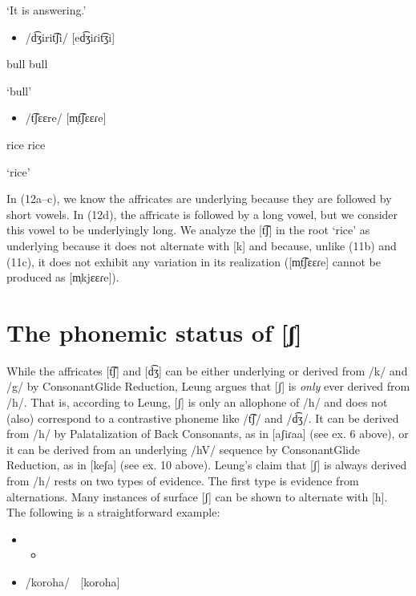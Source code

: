 \documentclass[output=paper]{langsci/langscibook}
\begin{document}
\textsc{    ‘}It is answering.’

\begin{itemize}
\item /d͡ʒirit͡ʃi/  [ed͡ʒiɾit͡ʒi]

\end{itemize}

bull  bull

    ‘bull’

\begin{itemize}
\item /t͡ʃɛɛre/  [m̩t͡ʃɛɛɾe]

\end{itemize}

rice  rice

    ‘rice’

In (12a–c), we know the affricates are underlying because they are followed by short vowels. In (12d), the affricate is followed by a long vowel, but we consider this vowel to be underlyingly long. We analyze the [t͡ʃ] in the root ‘rice’ as underlying because it does not alternate with [k] and because, unlike (11b) and (11c), it does not exhibit any variation in its realization ([m̩t͡ʃɛɛɾe] cannot be produced as [m̩kjɛɛɾe]).

\section{The phonemic status of [ʃ]} %

While the affricates [t͡ʃ] and [d͡ʒ] can be either underlying or derived from /k/ and /g/ by ConsonantGlide Reduction, Leung argues that [ʃ] is \textit{only} ever derived from /h/. That is, according to Leung, [ʃ] is only an allophone of /h/ and does not (also) correspond to a contrastive phoneme like /t͡ʃ/ and /d͡ʒ/. It can be derived from /h/ by Palatalization of Back Consonants, as in [aʃiɾaa] (see ex. 6 above), or it can be derived from an underlying /hV/ sequence by ConsonantGlide Reduction, as in [keʃa] (see ex. 10 above). Leung’s claim that [ʃ] is always derived from /h/ rests on two types of evidence. The first type is evidence from alternations. Many instances of surface [ʃ] can be shown to alternate with [h]. The following is a straightforward example:

\setcounter{itemize}{0}
\begin{itemize}
\item \setcounter{itemize}{0}
\begin{itemize}
\item \end{itemize}
\end{itemize}
\setcounter{itemize}{0}
\begin{itemize}
\item /koroha/    [koroha]

\end{itemize}
\end{document}
